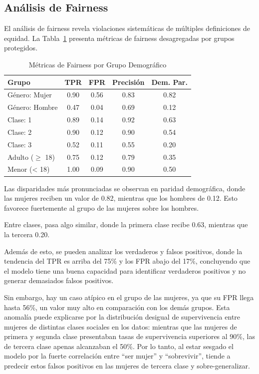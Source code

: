 \documentclass[conference]{IEEEtran}
\begin{document}
\subsection{Análisis de Fairness}

El análisis de fairness revela violaciones sistemáticas de múltiples definiciones de equidad. La Tabla~\ref{tab:fairness_metrics} presenta métricas de fairness desagregadas por grupos protegidos.

\begin{table}[htbp]
\caption{Métricas de Fairness por Grupo Demográfico}
\label{tab:fairness_metrics}
\begin{center}
\small
\setlength{\tabcolsep}{5pt}
\begin{tabular}{|l|c|c|c|c|}
\hline
\textbf{Grupo} & \textbf{TPR} & \textbf{FPR} & \textbf{Precisión} & \textbf{Dem. Par.} \\
\hline
Género: Mujer     & 0.90  & 0.56  & 0.83  & 0.82 \\
Género: Hombre    & 0.47  & 0.04  & 0.69  & 0.12 \\
\hline
Clase: 1          & 0.89  & 0.14  & 0.92  & 0.63 \\
Clase: 2          & 0.90  & 0.12  & 0.90  & 0.54 \\
Clase: 3          & 0.52  & 0.11  & 0.55  & 0.20 \\
\hline
Adulto ($\geq$ 18)     & 0.75  & 0.12  & 0.79  & 0.35 \\
Menor (< 18)      & 1.00  & 0.09  & 0.90  & 0.50 \\
\hline
\end{tabular}
\end{center}
\end{table}


Las disparidades más pronunciadas se observan en paridad demográfica, donde las mujeres reciben un valor de 0.82, mientras que los hombres de 0.12. Esto favorece fuertemente al grupo de las mujeres sobre los hombres.

Entre clases, pasa algo similar, donde la primera clase recibe 0.63, mientras que la tercera 0.20.

Además de esto, se pueden analizar los verdaderos y falsos positivos, donde la tendencia del TPR es arriba del 75\% y los FPR abajo del 17\%, concluyendo que el modelo tiene una buena capacidad para identificar verdaderos positivos y no generar demasiados falsos positivos.

Sin embargo, hay un caso atípico en el grupo de las mujeres, ya que su FPR llega hasta 56\%, un valor muy alto en comparación con los demás grupos. Esta anomalía puede explicarse por la distribución desigual de supervivencia entre mujeres de distintas clases sociales en los datos: mientras que las mujeres de primera y segunda clase presentaban tasas de supervivencia superiores al 90\%, las de tercera clase apenas alcanzaban el 50\%.
Por lo tanto, al estar sesgado el modelo por la fuerte correlación entre “ser mujer” y “sobrevivir”, tiende a predecir estos falsos positivos en las mujeres de tercera clase y sobre-generalizar.
\end{document}
